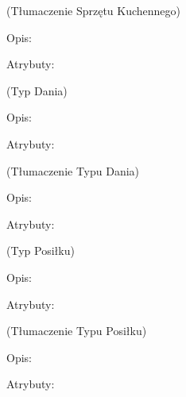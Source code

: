 \begin{enumerate}[label={\textbf{KAT/\protect\threedigits{\theenumi}}}, wide, labelwidth=!, labelindent=0pt, labelsep=0pt, series=reqs]
     \label{kat:KitchenApplianceTranslation} (Tłumaczenie Sprzętu Kuchennego)

    Opis: \lipsum[1]
    \par
    Atrybuty:
    \begin{itemize}[series=atr]
         \label{kat:KitchenApplianceTranslation:id}
         \label{kat:KitchenApplianceTranslation:translation}
         \label{kat:KitchenApplianceTranslation:language}
    \end{itemize}

     \label{kat:DishType} (Typ Dania)

    Opis: \lipsum[1]
    \par
    Atrybuty:
    \begin{itemize}[series=atr]
         \label{kat:DishType:id}
         \label{kat:DishType:description}
    \end{itemize}

     \label{kat:DishTypeTranslation} (Tłumaczenie Typu Dania)

    Opis: \lipsum[1]
    \par
    Atrybuty:
    \begin{itemize}[series=atr]
         \label{kat:DishTypeTranslation:id}
         \label{kat:DishTypeTranslation:translation}
         \label{kat:DishTypeTranslation:language}
    \end{itemize}

     \label{kat:MealType} (Typ Posiłku)

    Opis: \lipsum[1]
    \par
    Atrybuty:
    \begin{itemize}[series=atr]
         \label{kat:MealType:id}
         \label{kat:MealType:name}
    \end{itemize}

     \label{kat:MealTypeTranslation} (Tłumaczenie Typu Posiłku)

    Opis: \lipsum[1]
    \par
    Atrybuty:
    \begin{itemize}[series=atr]
         \label{kat:MealTypeTranslation:id}
         \label{kat:MealTypeTranslation:translation}
         \label{kat:MealTypeTranslation:language}
    \end{itemize}



\end{enumerate}
